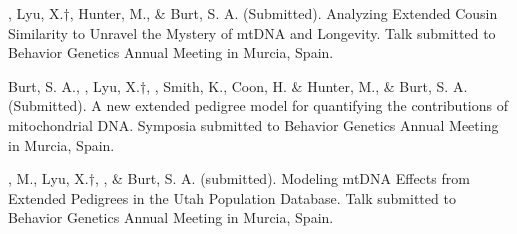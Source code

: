 
\item \meb, Lyu, X.$\dagger$, Hunter, M., \& Burt, S. A. (Submitted). Analyzing Extended Cousin Similarity to Unravel the Mystery of mtDNA and Longevity. Talk submitted to Behavior Genetics Annual Meeting in Murcia, Spain.

\item Burt, S. A., \meb, Lyu, X.$\dagger$, \Joe, Smith, K., Coon, H. \& Hunter, M., \& Burt, S. A. (Submitted). A new extended pedigree model for quantifying the contributions of mitochondrial DNA. Symposia submitted to Behavior Genetics Annual Meeting in Murcia, Spain.


\item \Hunter, M., Lyu, X.$\dagger$, \meb, \& Burt, S. A. (submitted). Modeling mtDNA Effects from Extended Pedigrees in the Utah Population Database. Talk submitted to Behavior Genetics Annual Meeting in Murcia, Spain.


%
%

%

%

%

%
